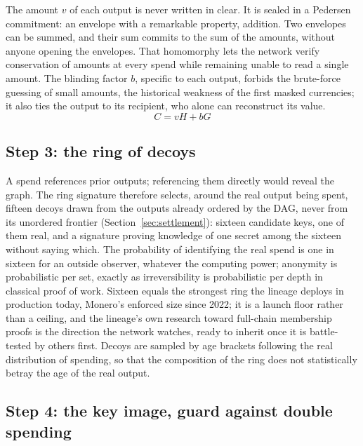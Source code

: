 The amount $v$ of each output is never written in clear. It is sealed in
a Pedersen commitment: an envelope with a remarkable property, addition.
Two envelopes can be summed, and their sum commits to the sum of the
amounts, without anyone opening the envelopes. That homomorphy lets the
network verify conservation of amounts at every spend while remaining
unable to read a single amount. The blinding factor $b$, specific to each
output, forbids the brute-force guessing of small amounts, the historical
weakness of the first masked currencies; it also ties the output to its
recipient, who alone can reconstruct its value.
\begin{equation}\label{eq:pedersen}
C = vH + bG
\end{equation}

\subsection{Step 3: the ring of decoys}

A spend references prior outputs; referencing them directly would reveal
the graph. The ring signature therefore selects, around the real output
being spent, fifteen decoys drawn from the outputs already ordered by the
DAG, never from its unordered frontier (Section~\ref{sec:settlement}):
sixteen candidate keys, one of them real, and a signature proving
knowledge of one secret among the sixteen without saying which. The
probability of identifying the real spend is one in sixteen for an outside
observer, whatever the computing power; anonymity is probabilistic per
set, exactly as irreversibility is probabilistic per depth in classical
proof of work. Sixteen equals the strongest ring the lineage deploys in
production today, Monero's enforced size since 2022; it is a launch floor
rather than a ceiling, and the lineage's own research toward full-chain
membership proofs is the direction the network watches, ready to inherit
once it is battle-tested by others first. Decoys are sampled by age
brackets following the real distribution of spending, so that the
composition of the ring does not statistically betray the age of the real
output.

\subsection{Step 4: the key image, guard against double spending}

